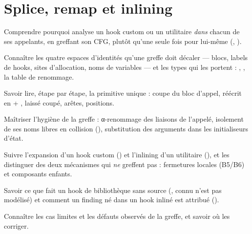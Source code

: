 \chapter{Splice, remap et inlining}
\label{chap:splice-inlining}

\begin{objectifs}
  \item Comprendre pourquoi \reactant{} analyse un hook custom ou un utilitaire \emph{dans} chacun de ses appelants, en greffant son CFG, plutôt qu'une seule fois pour lui-même (, ).
  \item Connaître les quatre espaces d'identités qu'une greffe doit décaler --- blocs, labels de hooks, sites d'allocation, noms de variables --- et les types qui les portent : , , la table de renommage.
  \item Savoir lire, étape par étape, la primitive unique  : coupe du bloc d'appel,  réécrit en  + ,  laissé coupé, arêtes, positions.
  \item Maîtriser l'hygiène de la greffe : α-renommage des liaisons de l'appelé, isolement de ses noms libres en collision (), substitution des arguments dans les initialiseurs d'état.
  \item Suivre l'expansion d'un hook custom () et l'inlining d'un utilitaire (), et les distinguer des deux mécanismes qui \emph{ne} greffent pas : fermetures locales (B5/B6) et composants enfants.
  \item Savoir ce que fait un hook de bibliothèque sans source (, \og connu n'est pas modélisé\fg{}) et comment un finding né dans un hook inliné est attribué ().
  \item Connaître les cas limites et les défauts observés de la greffe, et savoir où les corriger.
\end{objectifs}

